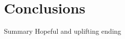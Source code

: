 \documentclass{acm_proc_article-sp}
\begin{document}




\section{Conclusions}
\label{sec:conclusions}
Summary
Hopeful and uplifting ending

%

%
%
\end{document}
